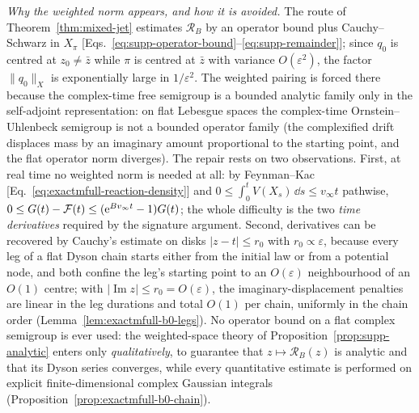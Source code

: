 \emph{Why the weighted norm appears, and how it is avoided.}
The route of Theorem~\ref{thm:mixed-jet} estimates \(\mathcal R_B\) by an
operator bound plus Cauchy--Schwarz in \(X_\pi\)
[Eqs.~\eqref{eq:supp-operator-bound}--\eqref{eq:supp-remainder}]; since
\(q_0\) is centred at \(z_0\ne\bar z\) while \(\pi\) is centred at \(\bar z\)
with variance \(O(\varepsilon^2)\), the factor \(\|q_0\|_X\) is
exponentially large in \(1/\varepsilon^2\).  The weighted pairing is forced
there because the complex-time free semigroup is a bounded analytic family
only in the self-adjoint representation: on flat Lebesgue spaces the
complex-time Ornstein--Uhlenbeck semigroup is not a bounded operator family
(the complexified drift displaces mass by an imaginary amount proportional
to the starting point, and the flat operator norm diverges).  The repair
rests on two observations.  First, at real time no weighted norm is needed
at all: by Feynman--Kac [Eq.~\eqref{eq:exactmfull-reaction-density}] and
\(0\le\int_0^tV(X_s)\,\dd s\le v_\infty t\) pathwise,
\(0\le G(t)-\mathcal F(t)\le(\mathrm e^{Bv_\infty t}-1)G(t)\); the whole difficulty
is the two \emph{time derivatives} required by the signature argument.
Second, derivatives can be recovered by Cauchy's estimate on disks
\(|z-t|\le r_0\) with \(r_0\propto\varepsilon\), because every leg of a flat
Dyson chain starts either from the initial law or from a potential node,
and both confine the leg's starting point to an \(O(\varepsilon)\)
neighbourhood of an \(O(1)\) centre; with \(|\operatorname{Im}z|\le
r_0=O(\varepsilon)\), the imaginary-displacement penalties are linear in the
leg durations and total \(O(1)\) per chain, uniformly in the chain order
(Lemma~\ref{lem:exactmfull-b0-legs}).  No operator bound on a flat complex
semigroup is ever used: the weighted-space theory of
Proposition~\ref{prop:supp-analytic} enters only \emph{qualitatively}, to
guarantee that \(z\mapsto\mathcal R_B(z)\) is analytic and that its Dyson
series converges, while every quantitative estimate is performed on
explicit finite-dimensional complex Gaussian integrals
(Proposition~\ref{prop:exactmfull-b0-chain}).

